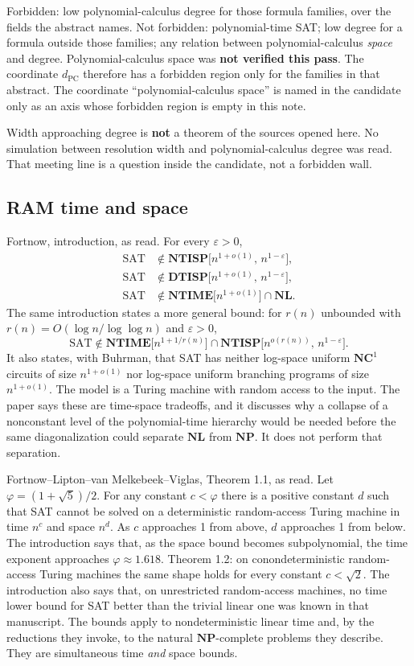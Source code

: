 \documentclass[11pt]{article}
\begin{document}
Forbidden: low polynomial-calculus degree for those formula families, over the fields the abstract names. Not forbidden: polynomial-time SAT; low degree for a formula outside those families; any relation between polynomial-calculus \emph{space} and degree. Polynomial-calculus space was \textbf{not verified this pass}. The coordinate \(d_{\mathrm{PC}}\) therefore has a forbidden region only for the families in that abstract. The coordinate ``polynomial-calculus space'' is named in the candidate only as an axis whose forbidden region is empty in this note.

Width approaching degree is \textbf{not} a theorem of the sources opened here. No simulation between resolution width and polynomial-calculus degree was read. That meeting line is a question inside the candidate, not a forbidden wall.

\subsection*{RAM time and space}
Fortnow, introduction, as read. For every \(\varepsilon>0\),
\begin{align*}
\mathrm{SAT}&\notin \mathbf{NTISP}\bigl[n^{1+o(1)},\, n^{1-\varepsilon}\bigr],\\
\mathrm{SAT}&\notin \mathbf{DTISP}\bigl[n^{1+o(1)},\, n^{1-\varepsilon}\bigr],\\
\mathrm{SAT}&\notin \mathbf{NTIME}\bigl[n^{1+o(1)}\bigr]\cap \mathbf{NL}.
\end{align*}
The same introduction states a more general bound: for \(r(n)\) unbounded with \(r(n)=O(\log n/\log\log n)\) and \(\varepsilon>0\),
\[
\mathrm{SAT}\notin \mathbf{NTIME}\bigl[n^{1+1/r(n)}\bigr]
\cap \mathbf{NTISP}\bigl[n^{o(r(n))},\, n^{1-\varepsilon}\bigr].
\]
It also states, with Buhrman, that SAT has neither log-space uniform \(\mathbf{NC}^1\) circuits of size \(n^{1+o(1)}\) nor log-space uniform branching programs of size \(n^{1+o(1)}\). The model is a Turing machine with random access to the input. The paper says these are time-space tradeoffs, and it discusses why a collapse of a nonconstant level of the polynomial-time hierarchy would be needed before the same diagonalization could separate \(\mathbf{NL}\) from \(\mathbf{NP}\). It does not perform that separation.

Fortnow--Lipton--van Melkebeek--Viglas, Theorem 1.1, as read. Let \(\varphi=(1+\sqrt{5})/2\). For any constant \(c<\varphi\) there is a positive constant \(d\) such that SAT cannot be solved on a deterministic random-access Turing machine in time \(n^c\) and space \(n^d\). As \(c\) approaches 1 from above, \(d\) approaches 1 from below. The introduction says that, as the space bound becomes subpolynomial, the time exponent approaches \(\varphi\approx 1.618\). Theorem 1.2: on conondeterministic random-access Turing machines the same shape holds for every constant \(c<\sqrt{2}\). The introduction also says that, on unrestricted random-access machines, no time lower bound for SAT better than the trivial linear one was known in that manuscript. The bounds apply to nondeterministic linear time and, by the reductions they invoke, to the natural \(\mathbf{NP}\)-complete problems they describe. They are simultaneous time \emph{and} space bounds.
\end{document}
